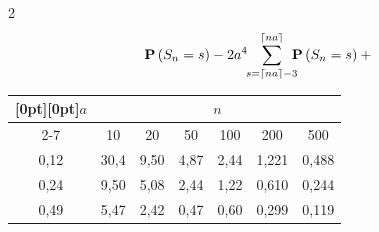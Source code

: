 \begin{multicols}{2}
\begin{multline*}
 \mathbf{P}\left(S_n=s\right)-


 2a^4\hspace*{-1mm}\sum\limits_{s=\lceil na \rceil-3}^{\lceil na \rceil}\hspace*{-2mm}


 \mathbf{P}\left(S_n=s\right)


  +{}


 \end{multline*}


 


 \end{multicols}


   \begin{table}\small


 \begin{center}


\parbox{296pt}{


}





\vspace*{2ex}





\tabcolsep=12pt


\begin{tabular}{|c|c|c|c|c|c|c|}


 \hline


\multicolumn{1}{|c|}{\raisebox{-6pt}[0pt][0pt]{$a$}}&\multicolumn{6}{c|}{$n$}\\


\cline{2-7}


& 10 & 20 & 50 & 100 & 200 & 500\\


 \hline


 0{,}12 & 30{,}4 & 9{,}50 & 4{,}87 & 2{,}44 & 1{,}221 & 0{,}488 \\




 0{,}24 & 9{,}50 & 5{,}08 & 2{,}44 & 1{,}22 & 0{,}610 & 0{,}244 \\




 0{,}49 & 5{,}47 & 2{,}42 & 0{,}47 & 0{,}60 & 0{,}299 & 0{,}119 \\





\end{tabular}
\end{center}
\end{table}
